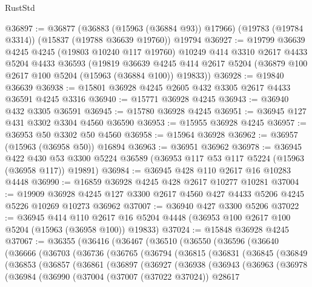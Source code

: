 \begin{lexlean}{RustStd}
\begin{coremodule}
@36897 := @36877
    (@36883 (@15963 (@36884 @93)) @17966)
    (@19783 (@19784 @3314))
    (@15837 (@19788 @36639 @19760))
    @19794
@36927 := @19799
    @36639
    @4245
    @4245
    (@19803 @10240 @117 @19760)
    @10249
    @414
    @3310
    @2617
    @4433
    @5204
    @4433
    @36593
    (@19819
      @36639
      @4245
      @414
      @2617
      @5204
      (@36879 @100 @2617 @100 @5204 (@15963 (@36884 @100)) @19833))
@36928 := @19840 @36639
@36938 := @15801 @36928 @4245 @2605 @432 @3305 @2617 @4433 @36591 @4245 @3316
@36940 := @15771 @36928 @4245
@36943 := @36940 @432 @3305 @36591
@36945 := @15780 @36928 @4245
@36951 := @36945 @127 @431 @3302 @3304 @4560 @36590
@36953 := @15955 @36928 @4245
@36957 := @36953 @50 @3302 @50 @4560
@36958 := @15964 @36928
@36962 := @36957 (@15963 (@36958 @50)) @16894
@36963 := @36951 @36962
@36978 := @36945
    @422
    @430
    @53
    @3300
    @5224
    @36589
    (@36953 @117 @53 @117 @5224 (@15963 (@36958 @117)) @19891)
@36984 := @36945 @428 @110 @2617 @16 @10283 @4448
@36990 := @16859 @36928 @4245 @428 @2617 @10277 @10281
@37004 := @19909
    @36928
    @4245
    @127
    @3300
    @2617
    @4560
    @427
    @4433
    @5206
    @4245
    @5226
    @10269
    @10273
    @36962
@37007 := @36940 @427 @3300 @5206
@37022 := @36945
    @414
    @110
    @2617
    @16
    @5204
    @4448
    (@36953 @100 @2617 @100 @5204 (@15963 (@36958 @100)) @19833)
@37024 := @15848 @36928 @4245
@37067 := @36355
    (@36416
      (@36467
        (@36510
          (@36550
            (@36596
              (@36640
                (@36666
                  (@36703
                    (@36736
                      (@36765
                        (@36794
                          (@36815
                            (@36831
                              (@36845
                                (@36849
                                  (@36853
                                    (@36857
                                      (@36861
                                        (@36897
                                          (@36927
                                            (@36938
                                              (@36943
                                                (@36963
                                                  (@36978
                                                    (@36984
                                                      (@36990
                                                        (@37004
                                                          (@37007 (@37022 @37024))
                                                          @28617

\end{coremodule}
\end{lexlean}
